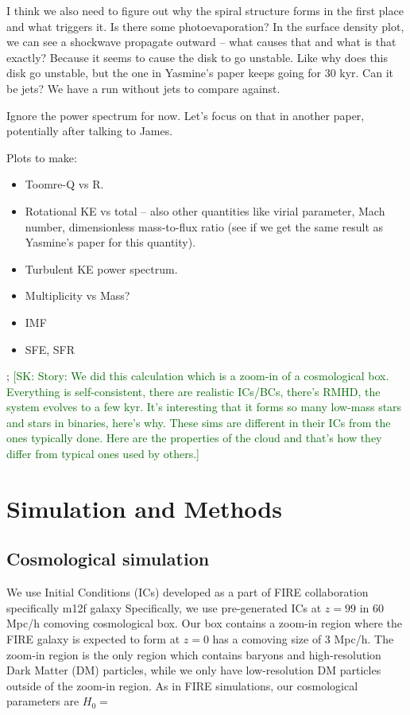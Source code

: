 \documentclass[twocolumn,11pt]{article}
\newcommand{\skcomment}[1]{{\textcolor{darkgreen}{[SK: #1]}}}
\begin{document}
I think we also need to figure out why the spiral structure forms in the first place and what triggers it. Is there some photoevaporation? In the surface density plot, we can see a shockwave propagate outward -- what causes that and what is that exactly? Because it seems to cause the disk to go unstable.
Like why does this disk go unstable, but the one in Yasmine's paper keeps going for 30 kyr.
Can it be jets? We have a run without jets to compare against.

Ignore the power spectrum for now. Let's focus on that in another paper, potentially after talking to James.

Plots to make:

\begin{itemize}
    \item Toomre-Q vs R.
    \item Rotational KE vs total -- also other quantities like virial parameter, Mach number, dimensionless mass-to-flux ratio (see if we get the same result as Yasmine's paper for this quantity).
    \item Turbulent KE power spectrum.
    \item Multiplicity vs Mass?
    \item IMF
    \item SFE, SFR
\end{itemize}
;
\skcomment{Story:
We did this calculation which is a zoom-in of a cosmological box. Everything is self-consistent, there are realistic ICs/BCs, there's RMHD, the system evolves to a few kyr. It's interesting that it forms so many low-mass stars and stars in binaries, here's why. These sims are different in their ICs from the ones typically done. Here are the properties of the cloud and that's how they differ from typical ones used by others.}


\section{Simulation and Methods}
\label{sec:methods}

\subsection{Cosmological simulation}
\label{sec:sim}

We use Initial Conditions (ICs) developed as a part of FIRE collaboration %
specifically m12f galaxy %
Specifically, we use pre-generated ICs at $z=99$ in 60 Mpc/h comoving cosmological box. Our box contains a zoom-in region where the FIRE galaxy is expected to form at $z=0$ has a comoving size of 3 Mpc/h. The zoom-in region is the only region which contains baryons and high-resolution Dark Matter (DM) particles, while we only have low-resolution DM particles outside of the zoom-in region. %
As in FIRE simulations, our cosmological parameters are
$H_0 = $ %
\end{document}
